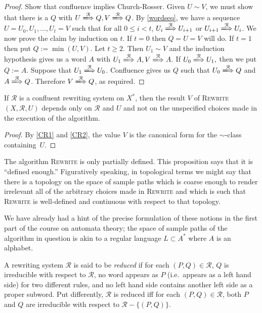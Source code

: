 \begin{proof}
    Show that confluence implies Church-Rosser. Given $U\sim V$, we must show
    that there is a $Q$ with $U\xLongrightarrow{\mathcal{R}} Q, V
    \xLongrightarrow{\mathcal{R}} Q$. By \ref{wordseq}, we have a sequence
    $U=U_0,U_1,\dots,U_t = V$ such that for all $0 \le i < t$, $U_i
    \xLongrightarrow{\mathcal{R}} U_{i+1}$ or $U_{i+1}
    \xLongrightarrow{\mathcal{R}} U_i$. We now prove the claim by induction on
    $t$. If $t=0$ then $Q = U = V$ will do. If $t=1$ then put $Q := \min(U,V)$.
    Let $t \ge 2$. Then $U_1\sim V$ and the induction hypothesis gives us a
    word $A$ with $U_1 \xLongrightarrow{\mathcal{R}} A, V
    \xLongrightarrow{\mathcal{R}} A.$ If $U_0 \xLongrightarrow{\mathcal{R}}
    U_1,$ then we put $Q:=A$. Suppose that $U_1 \xLongrightarrow{\mathcal{R}}
    U_0$. Confluence gives us $Q$ such that $U_0 \xLongrightarrow{\mathcal{R}}
    Q$ and $A \xLongrightarrow{\mathcal{R}} Q$. Therefore $V
    \xLongrightarrow{\mathcal{R}} Q$, as required.
\end{proof}

\begin{prop}\label{welldefined} If $\mathcal{R}$ is a confluent rewriting
    system on $X^*$, then the result $V$ of \textsc{Rewrite}$(X,\mathcal{R},U)$
    depends only on $\mathcal{R}$ and $U$ and not on the unspecified choices
    made in the execution of the algorithm.
\end{prop}
\begin{proof} By \ref{CR1} and \ref{CR2}, the value $V$ is the canonical form
    for the $\sim$-class containing~$U$.
\end{proof}

\begin{rem} The algorithm \textsc{Rewrite} is only partially defined. This
    proposition says that it is ``defined enough.'' Figuratively speaking, in
    topological terms we might say that there is a topology on the space of
    sample paths which is coarse enough to render irrelevant all of the
    arbitrary choices made in \textsc{Rewrite} and which is such that
    \textsc{Rewrite} is well-defined and continuous with respect to that
    topology.

    We have already had a hint of the precise formulation of these notions in
    the first part of the course on automata theory; the space of sample paths
    of the algorithm in question is akin to a regular language $L \subset A^*$
    where $A$ is an alphabet.
\end{rem}

\begin{defn} A rewriting system $\mathcal{R}$ is said to be \emph{reduced} if
    for each $(P,Q)\in \mathcal{R}$, $Q$ is irreducible with respect to
    $\mathcal{R}$, no word appears as $P$ (i.e.~appears as a left hand side)
    for two different rules, and no left hand side contains another left side
    as a proper subword. Put differently, $\mathcal{R}$ is reduced iff for each
    $(P,Q)\in \mathcal{R}$, both $P$ and $Q$ are irreducible with respect to
    $\mathcal{R}-\{(P,Q)\}.$
\end{defn}


